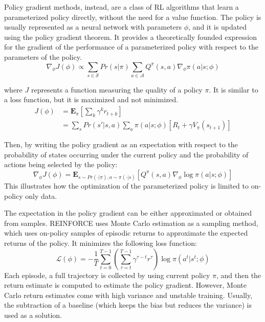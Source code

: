 Policy gradient methods, instead, are a class of RL algorithms that learn a parameterized policy directly, without the need for a value function. The policy is usually represented as a neural network with parameters $\phi$, and it is updated using the policy gradient theorem. 
It provides a theoretically founded expression for the gradient of the performance of a parameterized policy with respect to the parameters of the policy.
\begin{equation}
    \nabla_{\phi}J(\phi) \propto \sum_{s\in \mathcal{S}}Pr(s|\pi)\sum_{a\in\mathcal{A}}Q^{\pi}(s,a)\nabla_{\phi}\pi(a|s;\phi)
\end{equation}

where $J$ represents a function measuring the quality of a policy $\pi$. It is similar to a loss function, but it is maximized and not minimized.
\begin{align}
    J(\phi) &= \mathbf{E}_{\pi}\left[\sum_{k}\gamma^k r_{t+k}\right] \\
            &= \sum_s Pr(s'|s,a)\sum_a\pi(a|s;\phi)\left[R_t+\gamma V_{\pi}(s_{t+1})\right]
\end{align}

Then, by writing the policy gradient as an expectation with respect to the probability of states occurring under the current policy and the probability of actions being selected by the policy:
\begin{equation}
    \nabla_{\phi}J(\phi) = \mathbf{E}_{s\sim Pr(\cdot|\pi),a\sim\pi(\cdot|s)}\left[Q^{\pi}(s,a)\nabla_{\phi}\log\pi(a|s;\phi)\right]
\end{equation}
This illustrates how the optimization of the parameterized policy is limited to on-policy only data.

The expectation in the policy gradient can be either approximated or obtained from samples. REINFORCE uses Monte Carlo estimation as a sampling method, which uses on-policy samples of episodic returns to approximate the expected returns of the policy.
It minimizes the following loss function:
\begin{equation}
    \mathcal{L}(\phi) = -\frac{1}{T}\sum_{t=0}^{T-1}\left(\sum_{\tau=t}^{T-1}\gamma^{\tau-t}r^{\tau}\right)\log \pi(a^t|s^t;\phi)
\end{equation}
Each episode, a full trajectory is collected by using current policy $\pi$, and then the return estimate is computed to estimate the policy gradient. 
However, Monte Carlo return estimates come with high variance and unstable training. Usually, the subtraction of a baseline (which keeps the bias but reduces the variance) is used as a solution.

